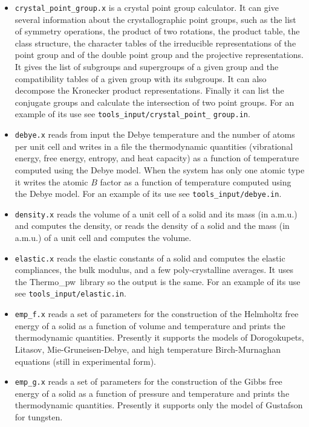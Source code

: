 \documentclass[12pt,a4paper,twoside]{report}
\def\thermo{{\sc Thermo}\_{\sc pw}}
\begin{document}
\begin{itemize}
\item \texttt{crystal\_point\_group.x} is a crystal point group calculator.
It can give several information about the crystallographic point groups,
such as the list of symmetry operations, the product of two rotations,
the product table, the class structure, the character tables of 
the irreducible representations of the point group and of the double
point group and the projective representations. It
gives the list of subgroups and supergroups of a given group and 
the compatibility tables of a given group with its subgroups. It can 
also decompose the Kronecker product representations. Finally it
can list the conjugate groups and calculate the intersection of two
point groups.
For an example of its use see \texttt{tools\_input/crystal\_point\_}
\texttt{group.in}.

\item \texttt{debye.x} reads from input the Debye temperature and the
number of atoms per unit cell and writes in a file the thermodynamic
quantities (vibrational energy, free energy, entropy, and heat capacity) as
a function of temperature computed using the Debye model. When the
system has only one atomic type it writes the atomic $B$ factor
as a function of temperature computed using the Debye model.
For an example of its use see \texttt{tools\_input/debye.in}.

\item \texttt{density.x} reads the volume of a unit cell of a solid
and its mass (in a.m.u.) and computes the density, or reads the density 
of a solid and the mass (in a.m.u.) of a unit cell and computes the volume.

\item \texttt{elastic.x} reads the elastic constants of a
solid and computes the elastic compliances, the bulk modulus, and a few
poly-crystalline averages. It uses the \thermo\ library so the output is the
same. 
For an example of its use see \texttt{tools\_input/elastic.in}.

\item \texttt{emp\_f.x} reads a set of parameters for the construction of
the Helmholtz free energy of a solid as a function of volume and 
temperature and prints the thermodynamic quantities. Presently it 
supports the models of Dorogokupets, Litasov, Mie-Gruneisen-Debye, 
and high temperature Birch-Murnaghan equations (still in experimental form).

\item \texttt{emp\_g.x} reads a set of parameters for the construction of
the Gibbs free energy of a solid as a function of pressure and temperature and
prints the thermodynamic quantities. Presently it supports only the model
of Gustafson for tungsten.


\end{itemize}
\end{document}
